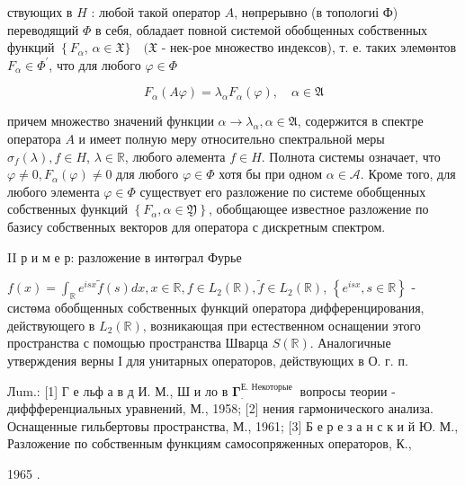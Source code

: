 \documentclass[10pt]{article}
\begin{document}
ствующих в $H$ : любой такой оператор $A$, нөпрерывно (в топологиі Ф) переводящий $\Phi$ в себя, обладает повной системой обобщенных собственных функций $\left\{F_{\alpha}\right.$, $\alpha \in \mathfrak{X}\} \quad(\mathfrak{X}$ - нек-рое множество индексов), т. е. таких элемөнтов $F_{\alpha} \in \Phi^{\prime}$, что для любого $\varphi \in \Phi$



\[

F_{\alpha}(A \varphi)=\lambda_{\alpha} F_{\alpha}(\varphi), \quad \alpha \in \mathfrak{A}

\]



причем множество значений функции $\alpha \rightarrow \lambda_{\alpha}, \alpha \in \mathfrak{A}$, содержится в спектре оператора $A$ и имеет полную меру относительно спектральной меры $\sigma_{f}(\lambda), f \in H$, $\lambda \in \mathbb{R}$, любого әлемента $f \in H$. Полнота системы означает, что $\varphi \neq 0, F_{\alpha}(\varphi) \neq 0$ для любого $\varphi \in \Phi$ хотя бы при одном $\alpha \in \mathscr{A}$. Кроме того, для любого элемента $\varphi \in \Phi$ существует его разложение по системе обобщенных собственных функций $\left\{F_{\alpha}, \alpha \in \mathfrak{Y}\right\}$, обобщающее известное разложение по базису собственных векторов для оператора с дискретным спектром.



II р и м е р: разложение в интөграл Фурье



$f(x)=\int_{\mathbb{R}} e^{i s x} \tilde{f}(s) d x, x \in \mathbb{R}, f \in L_{2}(\mathbb{R}), \tilde{f} \in L_{2}(\mathbb{R})$, $\left\{e^{i s x}, s \in \mathbb{R}\right\}$ - систөма обобщенных собственных функций оператора дифференцирования, действующего в $L_{2}(\mathbb{R})$, возникающая при естественном оснащении этого пространства с помощью пространства Шварца $S(\mathbb{R})$. Аналогичные утверждения верны І для унитарных операторов, действующих в О. г. п.



Лum.: [1] Г е льф а в д И. М., Ш и ло в $\boldsymbol{\Gamma}_{\text {. }}^{\text {Е. Некоторые }}$ вопросы теории - диффференциальных уравнений, М., 1958; [2] нения гармонического анализа. Оснащенные гильбертовы пространства, М., 1961; [3] Б е р е з а н с к и й Ю. М., Разложение по собственным функциям самосопряженных операторов, К.,

1965 .
\end{document}
